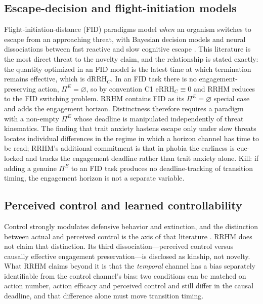 \documentclass[9pt,twocolumn]{article}
\newcommand{\eRRHc}{\mathrm{eRRH}_{C}}
\newcommand{\dRRHc}{\mathrm{dRRH}_{C}}
\begin{document}
\subsection{Escape-decision and flight-initiation models}
\label{sec:fid}
Flight-initiation-distance (FID) paradigms model \emph{when} an organism switches to escape from an approaching threat, with Bayesian decision models and neural dissociations between fast reactive and slow cognitive escape \cite{qi2018,fung2019}. This literature is the most direct threat to the novelty claim, and the relationship is stated exactly: the quantity optimized in an FID model is the latest time at which termination remains effective, which is $\dRRHc$. In an FID task there is no engagement-preserving action, $\Pi^E=\varnothing$, so by convention C1 $\eRRHc\equiv0$ and RRHM reduces to the FID switching problem. RRHM contains FID as its $\Pi^E=\varnothing$ special case and adds the engagement horizon. Distinctness therefore requires a paradigm with a non-empty $\Pi^E$ whose deadline is manipulated independently of threat kinematics. The finding that trait anxiety hastens escape only under slow threats \cite{fung2019} locates individual differences in the regime in which a horizon channel has time to be read; RRHM's additional commitment is that in phobia the earliness is cue-locked and tracks the engagement deadline rather than trait anxiety alone. Kill: if adding a genuine $\Pi^E$ to an FID task produces no deadline-tracking of transition timing, the engagement horizon is not a separate variable.

\subsection{Perceived control and learned controllability}
Control strongly modulates defensive behavior and extinction, and the distinction between actual and perceived control is the axis of that literature \cite{maier2016,hartley2014,wood2015}. RRHM does not claim that distinction. Its third dissociation---perceived control versus causally effective engagement preservation---is disclosed as kinship, not novelty. What RRHM claims beyond it is that the \emph{temporal} channel has a bias separately identifiable from the control channel's bias: two conditions can be matched on action number, action efficacy and perceived control and still differ in the causal deadline, and that difference alone must move transition timing.
\end{document}
